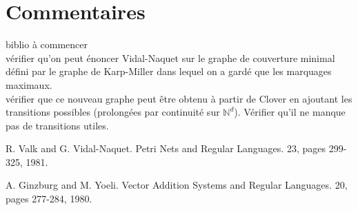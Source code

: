 \documentclass[a4paper,final]{article}
\theoremstyle{definition}
\newcommand{\N}{\ensuremath{\mathbb{N}}}
\begin{document}
\section{Commentaires}
biblio à commencer\\
vérifier qu'on peut énoncer Vidal-Naquet sur le graphe de couverture minimal défini par le graphe de Karp-Miller dans lequel on a gardé que les marquages maximaux.\\
vérifier que ce nouveau graphe peut être obtenu à partir de Clover en ajoutant les transitions possibles (prolongées par continuité sur $\N^d$). Vérifier qu'il ne manque pas de transitions utiles.


\begin{thebibliography}{10}

R. Valk and G. Vidal-Naquet.
\newblock Petri Nets and Regular Languages.
 23, pages 299-325, 1981.

A. Ginzburg and M. Yoeli.
\newblock Vector Addition Systems and Regular Languages.
 20, pages 277-284, 1980.

\end{thebibliography}
\end{document}

